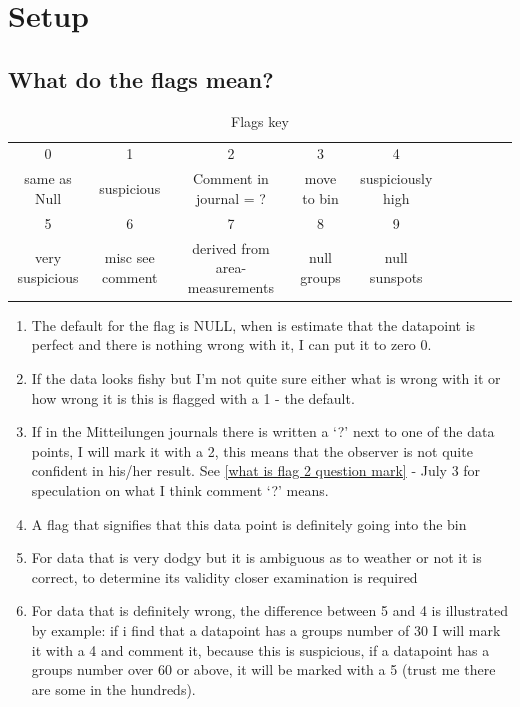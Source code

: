 \documentclass[12pt]{article}
\begin{document}
\section{Setup}

\subsection{What do the flags mean?}\label{flags section}
\newpage%
\begin{table}[H]
    \centering
    \begin{tabular}{c|c|c|c|c|c|c|c|c|c}
        0 & 1 & 2 & 3 & 4 \\
        same as Null & suspicious & Comment in journal = ? & move to bin & suspiciously high\\
        \hline
        5 & 6 & 7 & 8 & 9\\
        very suspicious & misc see comment & derived from area-measurements & null groups & null sunspots
         
    \end{tabular}
    \caption{Flags key}
    \label{tab:flag}
\end{table}

\begin{enumerate}[start=0]
    \item The default for the flag is NULL, when is estimate that the datapoint is perfect and there is nothing wrong with it, I can put it to zero 0.
    \item If the data looks fishy but I'm not quite sure either what is wrong with it or how wrong it is this is flagged with a 1 - the default.
    \item If in the Mitteilungen journals there is written a `?' next to one of the data points, I will mark it with a 2, this means that the observer is not quite confident in his/her result. See \ref{what is flag 2 question mark} - July 3 for speculation on what I think comment `?' means.
    \item A flag that signifies that this data point is definitely going into the bin
    \item For data that is very dodgy but it is ambiguous as to weather or not it is correct, to determine its validity closer examination is required
    \item For data that is definitely wrong, the difference between 5 and 4 is illustrated by example: if i find that a datapoint has a groups number of 30 I will mark it with a 4 and comment it, because this is suspicious, if a datapoint has a groups number over 60 or above, it will be marked with a 5 (trust me there are some in the hundreds).
\end{enumerate}
\end{document}
